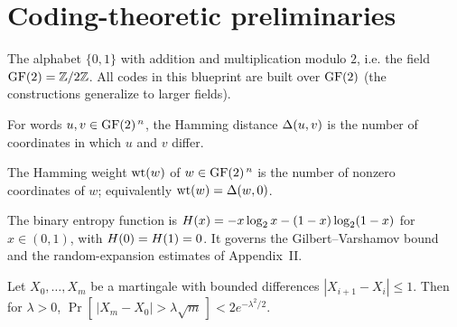 
\chapter{Coding-theoretic preliminaries}


\begin{definition}
  \label{def:gf2}
  \mathlibok
  The alphabet $\{0,1\}$ with addition and multiplication modulo $2$, i.e. the
  field $\mathrm{GF}(2) = \mathbb{Z}/2\mathbb{Z}$. All codes in this blueprint are built
  over $\mathrm{GF}(2)$ (the constructions generalize to larger fields).
\end{definition}

\begin{definition}
  \label{def:hamming-dist}
  \mathlibok
  For words $u,v \in \mathrm{GF}(2)^{\,n}$, the Hamming distance $\Delta(u,v)$ is the
  number of coordinates in which $u$ and $v$ differ.
\end{definition}

\begin{definition}
  \label{def:hamming-weight}
  \mathlibok
  The Hamming weight $\operatorname{wt}(w)$ of $w \in \mathrm{GF}(2)^{\,n}$ is the number of nonzero
  coordinates of $w$; equivalently $\operatorname{wt}(w) = \Delta(w,0)$.
\end{definition}

\begin{definition}
  \label{def:binary-entropy}
  \mathlibok
  The binary entropy function is
  $H(x) = -x\log_2 x - (1-x)\log_2(1-x)$ for $x \in (0,1)$, with
  $H(0)=H(1)=0$. It governs the Gilbert--Varshamov bound and the
  random-expansion estimates of Appendix~II.
\end{definition}

\begin{lemma}
  \label{lem:azuma}
  \mathlibok
  Let $X_0,\dots,X_m$ be a martingale with bounded differences
  $|X_{i+1}-X_i| \le 1$. Then for $\lambda > 0$,
  $\Pr[\,|X_m - X_0| > \lambda\sqrt{m}\,] < 2e^{-\lambda^2/2}$.
\end{lemma}

